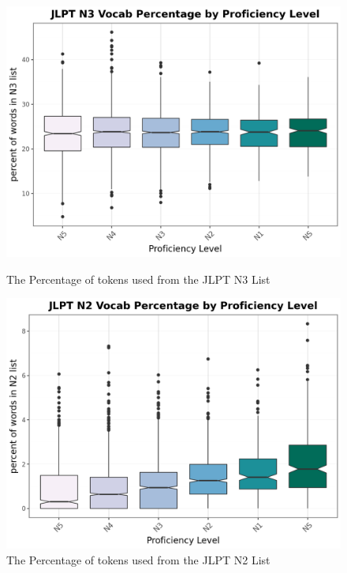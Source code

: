 \begin{figure}[htbp]
    \centering
    \begin{minipage}{.48\textwidth}
        \centering
    \includegraphics[scale=.4]{img/LFP/JLPT_N3}
    \caption[Percentage of tokens used from the JLPT N3 List]{The Percentage of tokens used from the JLPT N3 List}
        \label{fig:JLPTN3vocab}
    \end{minipage}
    \hfill
\begin{minipage}{.48\textwidth}
        \centering
        \includegraphics[scale=.4]{img/LFP/JLPT_N2}
        \caption[Percentage of tokens used from the JLPT N2 List]{The Percentage of tokens used from the JLPT N2 List}
\label{fig:JLPTN2vocab}
\end{minipage}
    \end{figure}

